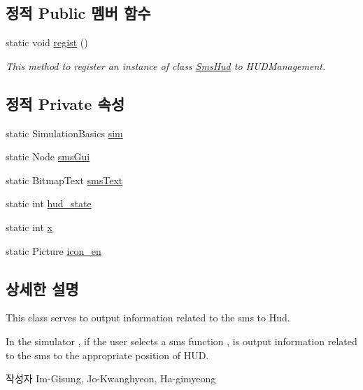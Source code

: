 \subsection*{정적 Public 멤버 함수}
\begin{DoxyCompactItemize}
\item 
static void \hyperlink{classkr_1_1ac_1_1kookmin_1_1cs_1_1sms_1_1_sms_hud_a6e359cc9e0d778e3625d02cfa80a1c9a}{regist} ()
\begin{DoxyCompactList}\small\item\em This method to register an instance of class \hyperlink{classkr_1_1ac_1_1kookmin_1_1cs_1_1sms_1_1_sms_hud}{Sms\+Hud} to H\+U\+D\+Management. \end{DoxyCompactList}\end{DoxyCompactItemize}
\subsection*{정적 Private 속성}
\begin{DoxyCompactItemize}
\item 
static Simulation\+Basics \hyperlink{classkr_1_1ac_1_1kookmin_1_1cs_1_1sms_1_1_sms_hud_af6e0bca70fb93df48b91fa40cf202ec0}{sim}
\item 
static Node \hyperlink{classkr_1_1ac_1_1kookmin_1_1cs_1_1sms_1_1_sms_hud_a45c98373f394ac95c2e360e2625a81ef}{sms\+Gui}
\item 
static Bitmap\+Text \hyperlink{classkr_1_1ac_1_1kookmin_1_1cs_1_1sms_1_1_sms_hud_a6a1a2ed2311a25a2e28f6a527aec312f}{sms\+Text}
\item 
static int \hyperlink{classkr_1_1ac_1_1kookmin_1_1cs_1_1sms_1_1_sms_hud_a7e4751ec05c3e04a3d43b617665397b8}{hud\+\_\+state}
\item 
static int \hyperlink{classkr_1_1ac_1_1kookmin_1_1cs_1_1sms_1_1_sms_hud_a6686da2137e471f3bf9cd38b5fa8eaa5}{x}
\item 
static Picture \hyperlink{classkr_1_1ac_1_1kookmin_1_1cs_1_1sms_1_1_sms_hud_a193c97d71fca49a82a8f4e9ba0fc7d5a}{icon\+\_\+en}
\end{DoxyCompactItemize}


\subsection{상세한 설명}
This class serves to output information related to the sms to Hud. 

In the simulator , if the user selects a sms function , is output information related to the sms to the appropriate position of H\+U\+D. \begin{DoxyAuthor}{작성자}
Im-\/\+Gisung, Jo-\/\+Kwanghyeon, Ha-\/gimyeong 
\end{DoxyAuthor}



